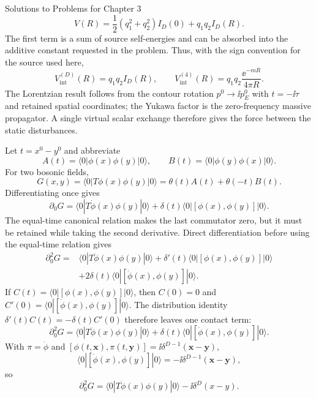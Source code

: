 \begin{bankssolutions}{Solutions to Problems for Chapter 3}
\begin{equation*}
 V(R)=\frac12(q_1^2+q_2^2)I_D(0)+q_1q_2 I_D(R).
\end{equation*}
The first term is a sum of source self-energies and can be absorbed into the
additive constant requested in the problem.  Thus, with the sign convention
for the source used here,
\begin{equation*}
 V_{\mathrm{int}}^{(D)}(R)=q_1q_2 I_D(R),
 \qquad
 V_{\mathrm{int}}^{(4)}(R)=q_1q_2\frac{\ee^{-mR}}{4\pi R}.
\end{equation*}
The Lorentzian result follows from the contour rotation $p^0\to\ii p_E^0$
with $t=-\ii\tau$ and retained spatial coordinates;
the Yukawa factor is the zero-frequency massive propagator.  A single virtual
scalar exchange therefore gives the force between the static disturbances.

Let $t=x^0-y^0$ and abbreviate
\begin{equation*}
 A(t)=\langle0|\phi(x)\phi(y)|0\rangle,
 \qquad B(t)=\langle0|\phi(y)\phi(x)|0\rangle.
\end{equation*}
For two bosonic fields,
\begin{equation*}
 G(x,y)=\langle0|T\phi(x)\phi(y)|0\rangle
 =\theta(t)A(t)+\theta(-t)B(t).
\end{equation*}
Differentiating once gives
\begin{equation*}
 \partial_0G=\langle0|T\dot\phi(x)\phi(y)|0\rangle
 +\delta(t)\langle0|[\phi(x),\phi(y)]|0\rangle.
\end{equation*}
The equal-time canonical relation makes the last commutator zero, but it must
be retained while taking the second derivative.  Direct differentiation before
using the equal-time relation gives
\begin{align*}
 \partial_0^2G={}&\langle0|T\ddot\phi(x)\phi(y)|0\rangle
 +\delta'(t)\langle0|[\phi(x),\phi(y)]|0\rangle\\
 &+2\delta(t)\langle0|[\dot\phi(x),\phi(y)]|0\rangle.
\end{align*}
If $C(t)=\langle0|[\phi(x),\phi(y)]|0\rangle$, then
$C(0)=0$ and $C'(0)=\langle0|[\dot\phi(x),\phi(y)]|0\rangle$.
The distribution identity $\delta'(t)C(t)=-\delta(t)C'(0)$ therefore leaves
one contact term:
\begin{equation*}
 \partial_0^2G=\langle0|T\ddot\phi(x)\phi(y)|0\rangle
 +\delta(t)\langle0|[\dot\phi(x),\phi(y)]|0\rangle.
\end{equation*}
With $\pi=\dot\phi$ and $[\phi(t,\mathbf x),\pi(t,\mathbf y)]
=\ii\delta^{D-1}(\mathbf x-\mathbf y)$,
\begin{equation*}
 \langle0|[\dot\phi(x),\phi(y)]|0\rangle
 =-\ii\delta^{D-1}(\mathbf x-\mathbf y),
\end{equation*}
so
\begin{equation*}
 \partial_0^2G=\langle0|T\ddot\phi(x)\phi(y)|0\rangle
 -\ii\delta^D(x-y).
\end{equation*}


\end{bankssolutions}
